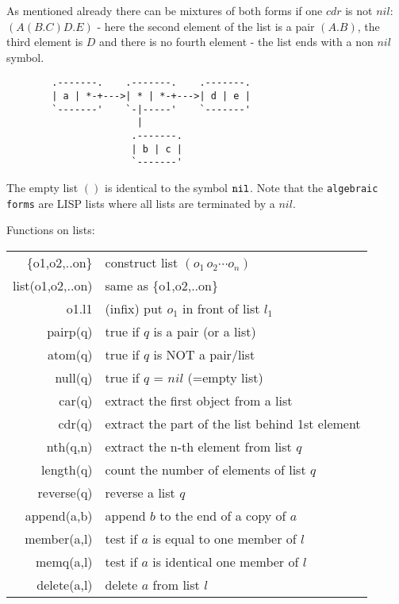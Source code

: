 As mentioned already there can
be mixtures of both forms if one $cdr$ is not $nil$:
$(A (B.C) D.E)$ - here the second element of the list is
a pair $(A.B)$, the third element is $D$ and there is
no fourth element - the list ends with a non $nil$ symbol.

{\nopagebreak[3]
\begin{verbatim}
        .-------.    .-------.    .-------.
        | a | *-+--->| * | *-+--->| d | e |
        `-------'    `-|-----'    `-------'
                       |
                      .-------. 
                      | b | c | 
                      `-------' 
\end{verbatim}
}
\noindent
The empty list $()$ is identical to the symbol ${\tt nil}$.
Note that the {\reduce} {\tt algebraic forms}  
are LISP lists where all lists are terminated by a $nil$. 

Functions on lists:
\begin{center}
\begin{tabular}{|r|l|} \hline
 \{o1,o2,..on\} & construct list $(o_1\, o_2 \cdots o_n)$ \\
 list(o1,o2,..on) & same as \{o1,o2,..on\} \\
   o1.l1  & (infix) put $o_1$ in front of list $l_1$ \\
   pairp(q) & true if $q$ is a pair (or a list) \\
   atom(q)  & true if $q$ is  NOT a pair/list  \\
   null(q) & true if $q$ = $nil$ (=empty list) \\
   car(q)   & extract the first object from a list \\
   cdr(q)   & extract the part of the list behind 1st element \\ 
   nth(q,n) & extract the n-th element from list $q$\\
   length(q) & count the number of elements of list $q$\\
   reverse(q) & reverse a list $q$\\
   append(a,b)& append $b$ to the end of a copy of $a$\\
   member(a,l) & test if $a$ is equal to one member of $l$\\
   memq(a,l) & test if $a$ is identical one member of $l$\\
   delete(a,l) & delete $a$ from list $l$\\
\hline
\end{tabular}
\end{center}
\ttindex{\{}\ttindex{\}}

